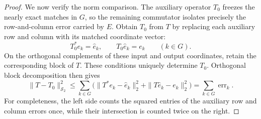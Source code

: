 \begin{proof}
We now verify the norm comparison.  The auxiliary operator \(T_0\) freezes the
nearly exact matches in \(G\), so the remaining commutator isolates precisely
the row-and-column error carried by \(E\).  Obtain \(T_0\) from \(T\) by
replacing each auxiliary row and column with
its matched coordinate vector:
\[
 T_0^*e_k=\widehat e_k,\qquad T_0\widehat e_k=e_k\qquad(k\in G).
\]
On the orthogonal complements of these input and output coordinates,
retain the corresponding block of $T$.  These conditions uniquely
determine $T_0$.
Orthogonal block decomposition then gives
\begin{equation}
 \|T-T_0\|_{\mathcal S_2}^2
 \leq\sum_{k\in G}
       \bigl(\|T^*e_k-\widehat e_k\|_2^2
                    +\|T\widehat e_k-e_k\|_2^2\bigr)
 =\sum_{k\in G}\operatorname{err}_k.
 \label{eq:auxiliary-coordinate-approximation}
\end{equation}
For completeness, the left side counts the squared entries of the
auxiliary row and column errors once, while their intersection is
counted twice on the right.


\end{proof}
